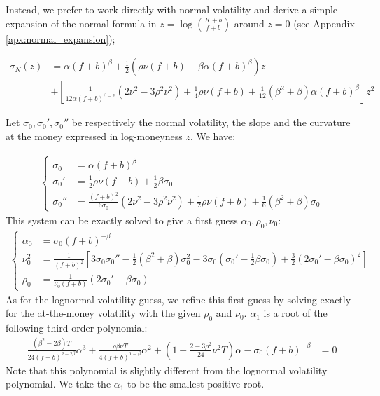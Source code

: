 \documentclass[]{rAMF2e}
\begin{document}
Instead, we prefer to work directly with normal volatility and derive a simple expansion of the normal formula in $z=\log\left(\frac{K+b}{f+b}\right)$ around $z=0$ (see Appendix \ref{apx:normal_expansion});

\begin{align}
\sigma_N(z) &= \alpha (f+b)^\beta + \frac{1}{2}\left(\rho \nu (f+b)+\beta \alpha (f+b)^\beta \right)z\nonumber\\
&+ \left[\frac{1}{12\alpha (f+b)^{\beta-2}}(2\nu^2-3\rho^2 \nu^2)+\frac{1}{4} \rho \nu (f+b)+\frac{1}{12}(\beta^2+\beta)\alpha (f+b)^\beta \right]z^2
\end{align}

Let $\sigma_0, \sigma_0', \sigma_0''$ be respectively the normal volatility, the slope and the curvature at the money expressed in log-moneyness $z$. We have:

\begin{align}
\begin{cases}
\sigma_0 &= \alpha (f+b)^{\beta}\\
\sigma_0' &= \frac{1}{2}\rho \nu (f+b) + \frac{1}{2} \beta \sigma_0\\
\sigma_0'' &= \frac{(f+b)^2}{6\sigma_0}(2\nu^2 - 3\rho^2\nu^2)+\frac{1}{2} \rho \nu (f+b)+\frac{1}{6}(\beta^2+\beta)\sigma_0
\end{cases}
\end{align}
This system can be exactly solved to give a first guess $\alpha_0, \rho_0,\nu_0$:
\begin{align}
  \begin{cases}
\alpha_0 &=  \sigma_0 (f+b)^{-\beta}\\
\nu_0^2 &= \frac{1}{(f+b)^2}\left[ 3\sigma_0\sigma_0''-\frac{1}{2}(\beta^2+\beta)\sigma_0^2-3\sigma_0(\sigma_0'-\frac{1}{2}\beta\sigma_0) +\frac{3}{2}\left(2\sigma_0'-\beta\sigma_0\right)^2\right] \\
\rho_0 &= \frac{1}{\nu_0 (f+b)}\left(2\sigma_0'-\beta\sigma_0\right) 
\end{cases} 
\end{align}
As for the lognormal volatility guess, we refine this first guess by solving exactly for the at-the-money volatility with the given $\rho_0$ and $\nu_0$. $\alpha_1$ is a root of the following third order polynomial:
\begin{align}
\frac{(\beta^2-2\beta) T}{24 (f+b)^{2-2\beta}}\alpha^3+ \frac{\rho\beta\nu T}{4(f+b)^{1-\beta}}\alpha^2 + \left(1+\frac{2-3\rho^2}{24}\nu^2 T\right)\alpha - \sigma_0 (f+b)^{-\beta} &= 0
\end{align}
Note that this polynomial is slightly different from the lognormal volatility polynomial. We take the $\alpha_1$ to be the smallest positive root.
 
\end{document}

